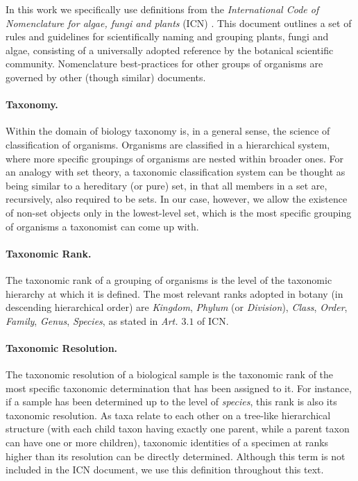 In this work we specifically use definitions from the \textit{International Code of Nomenclature for algae, fungi and plants} (ICN) \cite{McNeill2012}. This document outlines a set of rules and guidelines for scientifically naming and grouping plants, fungi and algae, consisting of a universally adopted reference by the botanical scientific community. Nomenclature best-practices for other groups of organisms are governed by other (though similar) documents.

\paragraph*{Taxonomy.}
Within the domain of biology taxonomy is, in a general sense, the science of classification of organisms. 
Organisms are classified in a hierarchical system, where more specific groupings of organisms are nested within broader ones. 
For an analogy with set theory, a taxonomic classification system can be thought as being similar to a hereditary (or pure) set, in that all members in a set are, recursively, also required to be sets. In our case, however, we allow the existence of non-set objects only in the lowest-level set, which is the most specific grouping of organisms a taxonomist can come up with.

\paragraph*{Taxonomic Rank.}
The taxonomic rank of a grouping of organisms is the level of the taxonomic hierarchy at which it is defined. The most relevant ranks adopted in botany (in descending hierarchical order) are \textit{Kingdom}, \textit{Phylum} (or \textit{Division}), \textit{Class}, \textit{Order}, \textit{Family}, \textit{Genus}, \textit{Species}, as stated in \textit{Art. $3.1$} of ICN.

\paragraph*{Taxonomic Resolution.}
The taxonomic resolution of a biological sample is the taxonomic rank of the most specific taxonomic determination that has been assigned to it.
For instance, if a sample has been determined up to the level of \textit{species}, this rank is also its taxonomic resolution.
As taxa relate to each other on a tree-like hierarchical structure (with each child taxon having exactly one parent, while a parent taxon can have one or more children), taxonomic identities of a specimen at ranks higher than its resolution can be directly determined.
Although this term is not included in the ICN document, we use this definition throughout this text.


